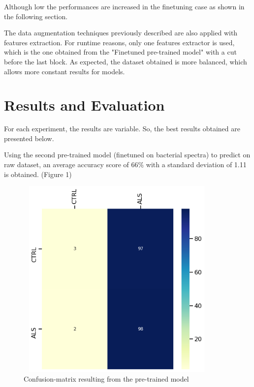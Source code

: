 Although low the performances are increased  in the finetuning case as shown in the following section.

The data augmentation techniques previously described are also applied with features extraction. For runtime reasons, only one features extractor is used, which is the one obtained from the "Finetuned pre-trained model" with a cut before the last block.
As expected, the dataset obtained is more balanced, which allows more constant results for models.

\section{Results and Evaluation}
For each experiment, the results are variable. So, the best results obtained are presented below.

Using the second pre-trained model (finetuned on bacterial spectra) to predict on raw dataset, an average accuracy score of 66\% with a standard deviation of 1.11 is obtained. (Figure 1)
\begin{figure}[H]
\centering
\caption{Confusion-matrix resulting from the pre-trained model}
\includegraphics[width=10cm, height=10cm]{raw_model_results}
\end{figure}

